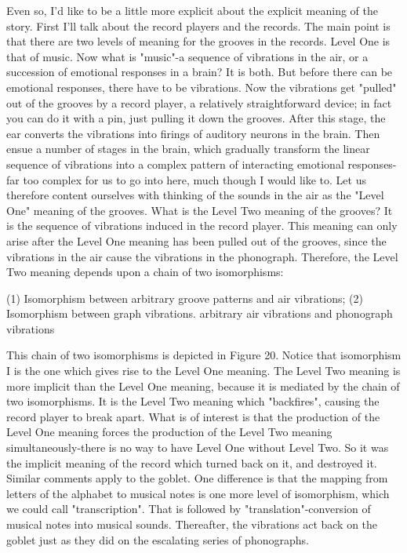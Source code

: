 Even so, I'd like to be a little more explicit about the explicit meaning of the story. First I'll talk about the record players and the records. The main point is that there are two levels of meaning for the grooves in the records. Level One is that of music. Now what is "music"-a sequence of vibrations in the air, or a succession of emotional responses in a brain? It is both. But before there can be emotional responses, there have to be vibrations. Now the vibrations get "pulled" out of the grooves by a record player, a relatively straightforward device; in fact you can do it with a pin, just pulling it down the grooves. After this stage, the ear converts the vibrations into firings of auditory neurons in the brain. Then ensue a number of stages in the brain, which gradually transform the linear sequence of vibrations into a complex pattern of interacting emotional responses-far too complex for us to go into here, much though I would like to. Let us therefore content ourselves with thinking of the sounds in the air as the "Level One" meaning of the grooves. What is the Level Two meaning of the grooves? It is the sequence of vibrations induced in the record player. This meaning can only arise after the Level One meaning has been pulled out of the grooves, since the vibrations in the air cause the vibrations in the phonograph. Therefore, the Level Two meaning depends upon a chain of two isomorphisms: 

(1) Isomorphism between arbitrary groove patterns and air vibrations; (2) Isomorphism between graph vibrations. arbitrary air vibrations and phonograph vibrations 

This chain of two isomorphisms is depicted in Figure 20. Notice that isomorphism I is the one which gives rise to the Level One meaning. The Level Two meaning is more implicit than the Level One meaning, because it is mediated by the chain of two isomorphisms. It is the Level Two meaning which "backfires", causing the record player to break apart. What is of interest is that the production of the Level One meaning forces the production of the Level Two meaning simultaneously-there is no way to have Level One without Level Two. So it was the implicit meaning of the record which turned back on it, and destroyed it. Similar comments apply to the goblet. One difference is that the mapping from letters of the alphabet to musical notes is one more level of isomorphism, which we could call "transcription". That is followed by "translation"-conversion of musical notes into musical sounds. Thereafter, the vibrations act back on the goblet just as they did on the escalating series of phonographs. 







